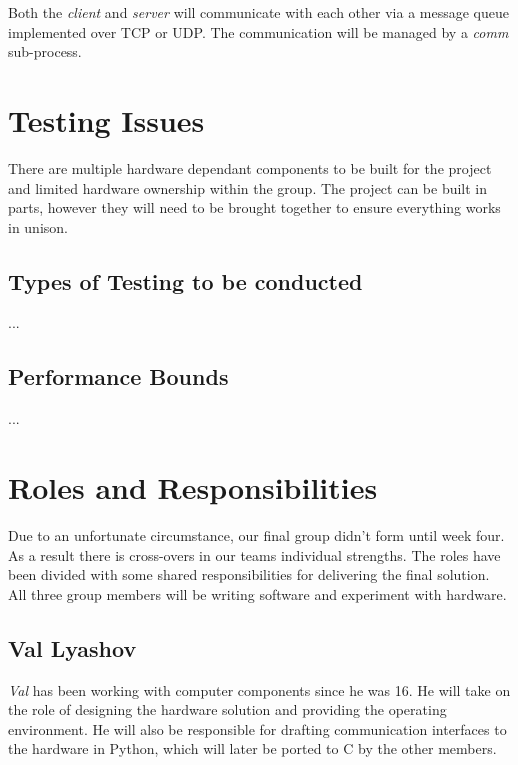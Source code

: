 \documentclass[11pt,a4paper,titlepage]{report}
\begin{document}
Both the \textit{client} and \textit{server} will communicate with each other via a message queue implemented over TCP or UDP. The communication will be managed by a \textit{comm} sub-process.



\section{Testing Issues}

There are multiple hardware dependant components to be built for the project and limited hardware ownership within the group. The project can be built in parts, however they will need to be brought together to ensure everything works in unison. 

\subsection{Types of Testing to be conducted}

{\color{red}...}

\subsection{Performance Bounds}

{\color{red}...}




\section{Roles and Responsibilities}



Due to an unfortunate circumstance, our final group didn't form until week four. As a result there is cross-overs in our teams individual strengths. The roles have been divided with some shared responsibilities for delivering the final solution. All three group members will be writing software and experiment with hardware.


\subsection{Val Lyashov}
\textit{Val} has been working with computer components since he was 16. He will take on the role of designing the hardware solution and providing the operating environment. He will also be responsible for drafting communication interfaces to the hardware in Python, which will later be ported to C by the other members.
\end{document}

